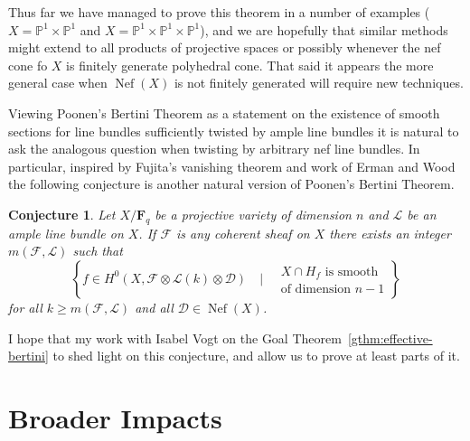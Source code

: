 \documentclass[10pt,reqno]{amsart}
\newtheorem{conj}[lemma]{Conjecture}
\theoremstyle{remark}
\newcommand{\Nef}{\operatorname{Nef}}
\newcommand{\fF}{\mathbf F}
\newcommand{\cD}{\mathcal{D}}
\newcommand{\cF}{\mathcal{F}}
\newcommand{\cL}{\mathcal{L}}
\renewcommand{\P}{\mathbb{P}}
\begin{document}
Thus far we have managed to prove this theorem in a number of examples ($X=\P^1\times\P^1$ and $X=\P^1\times\P^1\times\P^1$), and we are hopefully that similar methods might extend to all products of projective spaces or possibly whenever the nef cone fo $X$ is finitely generate polyhedral cone. That said it appears the more general case when $\Nef(X)$ is not finitely generated will require new techniques. 

Viewing Poonen's Bertini Theorem as a statement on the existence of smooth sections for line bundles sufficiently twisted by ample line bundles it is natural to ask the analogous question when twisting by arbitrary nef line bundles. In particular, inspired by Fujita's vanishing theorem and work of Erman and Wood the following conjecture is another natural version of Poonen's Bertini Theorem. 

 \begin{conj}
 Let $X/\fF_{q}$ be a projective variety of dimension $n$ and $\cL$ be an ample line bundle on $X$. If $\cF$ is any  coherent sheaf on $X$ there exists an integer $m(\cF,\cL)$ such that 
\begin{equation}
\left\{
f \in H^0\left(X, \cF\otimes\cL(k)\otimes \cD\right) \quad \bigg| \quad 
\begin{matrix}
 \text{$X\cap H_{f}$ is smooth}\\
 \text{of dimension $n-1$}
 \end{matrix}
\right\}
\end{equation}
for all $k\geq m(\cF,\cL)$ and all $\cD\in \Nef(X)$. 
 \end{conj}

I hope that my work with Isabel Vogt on the Goal Theorem~\ref{gthm:effective-bertini} to shed light on this conjecture, and allow us to prove at least parts of it. 


\section{Broader Impacts}
\end{document}
